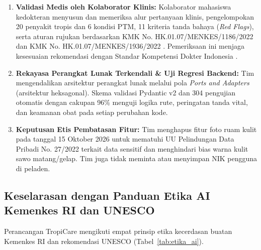\begin{enumerate}
    \item \textbf{Validasi Medis oleh Kolaborator Klinis:} Kolaborator mahasiswa kedokteran menyusun dan memeriksa alur pertanyaan klinis, pengelompokan 20 penyakit tropis dan 6 kondisi PTM, 11 kriteria tanda bahaya (\textit{Red Flags}), serta aturan rujukan berdasarkan KMK No. HK.01.07/MENKES/1186/2022 \citep{Kemenkes2022a} dan KMK No. HK.01.07/MENKES/1936/2022 \citep{Kemenkes2022b}. Pemeriksaan ini menjaga kesesuaian rekomendasi dengan Standar Kompetensi Dokter Indonesia \citep{KKI2012}.
    \item \textbf{Rekayasa Perangkat Lunak Terkendali \& Uji Regresi Backend:} Tim mengendalikan arsitektur perangkat lunak melalui pola \textit{Ports and Adapters} (arsitektur heksagonal). Skema validasi Pydantic v2 dan 304 pengujian otomatis dengan cakupan 96\% menguji logika rute, peringatan tanda vital, dan keamanan obat pada setiap perubahan kode.
    \item \textbf{Keputusan Etis Pembatasan Fitur:} Tim menghapus fitur foto ruam kulit pada tanggal 15 Oktober 2026 untuk mematuhi UU Pelindungan Data Pribadi No. 27/2022 \citep{UUPDP2022} terkait data sensitif dan menghindari bias warna kulit sawo matang/gelap. Tim juga tidak meminta atau menyimpan NIK pengguna di peladen.
\end{enumerate}

\subsection{Keselarasan dengan Panduan Etika AI Kemenkes RI dan UNESCO}

Perancangan TropiCare mengikuti empat prinsip etika kecerdasan buatan Kemenkes RI \citep{KemenkesDTO2024} dan rekomendasi UNESCO \citep{UNESCO2021} (Tabel~\ref{tab:etika_ai}).

